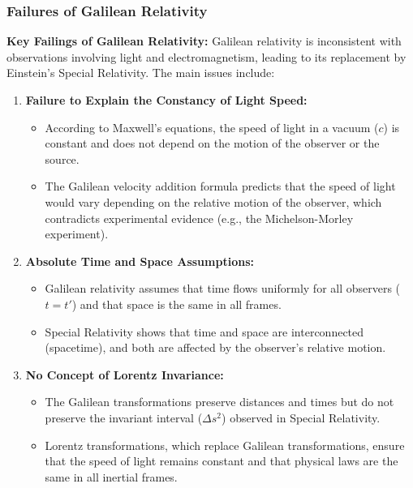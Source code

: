 \documentclass{article}
\newcommand{\conceptbox}[1]{\begin{tcolorbox}[colback=blue!10] #1 \end{tcolorbox}}
\begin{document}
\subsubsection{Failures of Galilean Relativity}
\conceptbox{
\textbf{Key Failings of Galilean Relativity:}
Galilean relativity is inconsistent with observations involving light and electromagnetism, leading to its replacement by Einstein's Special Relativity. The main issues include:

\begin{enumerate}
    \item \textbf{Failure to Explain the Constancy of Light Speed:}
    \begin{itemize}
        \item According to Maxwell's equations, the speed of light in a vacuum (\( c \)) is constant and does not depend on the motion of the observer or the source.
        \item The Galilean velocity addition formula predicts that the speed of light would vary depending on the relative motion of the observer, which contradicts experimental evidence (e.g., the Michelson-Morley experiment).
    \end{itemize}
    
    \item \textbf{Absolute Time and Space Assumptions:}
    \begin{itemize}
        \item Galilean relativity assumes that time flows uniformly for all observers (\( t = t' \)) and that space is the same in all frames.
        \item Special Relativity shows that time and space are interconnected (spacetime), and both are affected by the observer's relative motion.
    \end{itemize}

    \item \textbf{No Concept of Lorentz Invariance:}
    \begin{itemize}
        \item The Galilean transformations preserve distances and times but do not preserve the invariant interval (\( \Delta s^2 \)) observed in Special Relativity.
        \item Lorentz transformations, which replace Galilean transformations, ensure that the speed of light remains constant and that physical laws are the same in all inertial frames.
    \end{itemize}
\end{enumerate}
}
\end{document}
